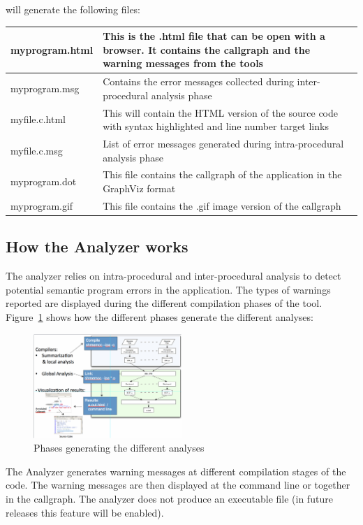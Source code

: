 will generate the following files:

\vspace{0.1in}

\begin{center}
  \begin{tabular}{| l | p{10cm} |}
    \hline
    myprogram.html & This is the .html file that can be open with a browser. It contains the callgraph and the warning messages from the tools \\
    \hline
    myprogram.msg & Contains the error messages collected during inter-procedural analysis phase \\
    \hline
    myfile.c.html & This will contain the HTML version of the source code with syntax highlighted and line number target links \\
    \hline
    myfile.c.msg & List of error messages generated during intra-procedural analysis phase \\
    \hline
    myprogram.dot & This file contains the callgraph of the application in the GraphViz format \\
    \hline
    myprogram.gif & This file contains the .gif image version of the callgraph \\
    \hline
  \end{tabular}
\end{center}

\subsection{How the \openshmem Analyzer works}

The \openshmem analyzer relies on intra-procedural and inter-procedural
analysis to detect potential semantic program errors in the
application. The types of warnings reported are displayed during the
different compilation phases of the tool. Figure~\ref{fig:phases} shows
how the different phases generate the different analyses:

\begin{figure}[!ht]
  \begin{center}
    \includegraphics[width=0.5\textwidth]{./image002}
    \caption{Phases generating the different analyses}
    \label{fig:phases}
  \end{center}
\end{figure}

The \openshmem Analyzer generates warning messages at different
compilation stages of the code. The warning messages are then
displayed at the command line or together in the callgraph.  The
\openshmem analyzer does not produce an executable file (in future
releases this feature will be enabled).
